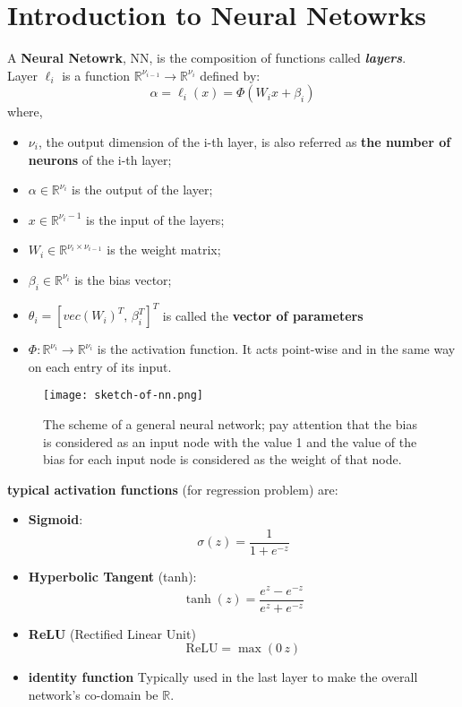 \section{Introduction to Neural Netowrks}
A \textbf{Neural Netowrk}, NN, is the composition of functions called \textit{\textbf{layers}}.\\

Layer $\ell_i$ is a function $\mathbb{R}^{\nu_{i-1}} \rightarrow \mathbb{R}^{\nu_i}$ defined by:
\[
\alpha = \ell_i(x) = \Phi(W_ix + \beta_i)
\]
where,
\begin{itemize}
    \item $\nu_i$, the output dimension of the i-th layer, is also referred as \textbf{the number of neurons} of the i-th layer;
    \item $\alpha \in \mathbb{R}^{\nu_i}$ is the output of the layer;
    \item $x \in \mathbb{R}^{\nu_i -1}$ is the input of the layers;
    \item $W_i \in \mathbb{R}^{\nu_i \times \nu_{i-1}}$ is the weight matrix;
    \item $\beta_i \in \mathbb{R}^{\nu_i}$ is the bias vector;
    \item $\theta_i = [vec(W_i)^T,\,\beta_i^T]^T$ is called the \textbf{vector of parameters}
    \item $\Phi: \mathbb{R}^{\nu_i} \rightarrow \mathbb{R}^{\nu_i}$ is the activation function. It acts point-wise and in the same way on each entry of its input.
\end{itemize}
\begin{figure}[H]
    \centering \texttt{[image: sketch-of-nn.png]}
    \caption{The scheme of a general neural network; pay attention that the bias is considered as an input node with the value 1 and the value of the bias for each input node is considered as the weight of that node.}
 \end{figure}

\textbf{typical activation functions} (for regression problem) are:
\begin{itemize}
    \item \textbf{Sigmoid}: 
    \[
    \sigma(z) = \frac{1}{1 + e^{-z}}
    \]
    \item \textbf{Hyperbolic Tangent} (tanh):
    \[
    \tanh(z) = \frac{e^z - e^{-z}}{e^z + e^{-z}}
    \]
    \item \textbf{ReLU} (Rectified Linear Unit)
    \[
    \text{ReLU} = \max(0\,z)
    \]
    \item \textbf{identity function} Typically used in the last layer to make the overall network's co-domain be $\mathbb{R}$.
\end{itemize}
\newpage

